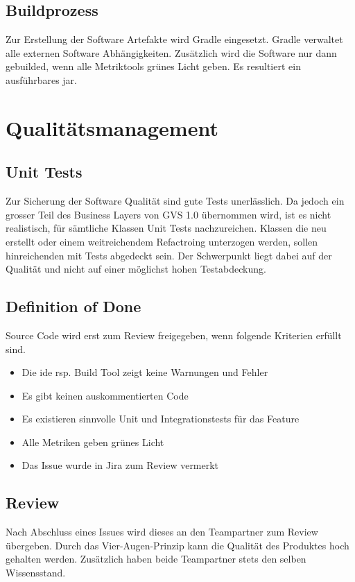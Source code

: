 \documentclass[11pt,a4paper,english,oneside]{book}
\numberwithin{equation}{chapter}
\begin{document}
	\subsection{Buildprozess}
	\label{sec:buildprocess}
	Zur Erstellung der Software Artefakte wird Gradle \cite{gradle} eingesetzt. Gradle verwaltet alle externen Software Abhängigkeiten. Zusätzlich wird die Software nur dann gebuilded, wenn alle Metriktools grünes Licht geben. Es resultiert ein ausführbares \gls{jar}.
		
	\section{Qualitätsmanagement}
	\label{sec:qualitymeasures}
	
	\subsection{Unit Tests}
	Zur Sicherung der Software Qualität sind gute Tests unerlässlich. Da jedoch ein grosser Teil des Business Layers von GVS 1.0 übernommen wird, ist es nicht realistisch, für sämtliche Klassen Unit Tests nachzureichen. Klassen die neu erstellt oder einem weitreichendem Refactroing unterzogen werden, sollen hinreichenden mit Tests abgedeckt sein. Der Schwerpunkt liegt dabei auf der Qualität und nicht auf einer möglichst hohen Testabdeckung.
	
	\subsection{Definition of Done} \label{ssec:dod}
	Source Code wird erst zum Review freigegeben, wenn folgende Kriterien erfüllt sind.
	\begin{itemize}
		\item Die \gls{ide} rsp. Build Tool zeigt keine Warnungen und Fehler
		\item Es gibt keinen auskommentierten Code
		\item Es existieren sinnvolle Unit und Integrationstests für das Feature
		\item Alle Metriken geben grünes Licht
		\item Das Issue wurde in Jira \cite{jira} zum Review vermerkt
	\end{itemize}
		
	\subsection{Review}
	Nach Abschluss eines Issues wird dieses an den Teampartner zum Review übergeben. Durch das Vier-Augen-Prinzip kann die Qualität des Produktes hoch gehalten werden. Zusätzlich haben beide Teampartner stets den selben Wissensstand.
	
\end{document}

